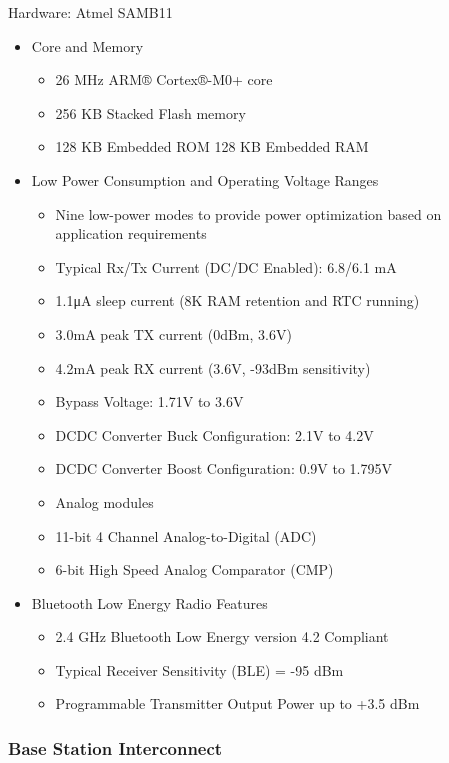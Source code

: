 \documentclass[journal]{IEEEtran}
\begin{document}
Hardware: Atmel SAMB11

\begin{itemize}
  \item Core and Memory
    \begin{itemize}
      \item 26 MHz ARM® Cortex®-M0+ core
      \item 256 KB Stacked Flash memory
      \item 128 KB Embedded ROM
        128 KB Embedded RAM
    \end{itemize}
  \item Low Power Consumption and Operating Voltage Ranges
    \begin{itemize}
      \item Nine low-power modes to provide power optimization based on application requirements
      \item Typical Rx/Tx Current (DC/DC Enabled): 6.8/6.1 mA
      \item 1.1μA sleep current (8K RAM retention and RTC running)
      \item 3.0mA peak TX current (0dBm, 3.6V)
      \item 4.2mA peak RX current (3.6V, -93dBm sensitivity)
      \item Bypass Voltage: 1.71V to 3.6V
      \item DCDC Converter Buck Configuration: 2.1V to 4.2V
      \item DCDC Converter Boost Configuration: 0.9V to 1.795V
      \item Analog modules
      \item 11-bit 4 Channel Analog-to-Digital (ADC)
      \item 6-bit High Speed Analog Comparator (CMP)
    \end{itemize}
  \item Bluetooth Low Energy Radio Features
    \begin{itemize}
      \item 2.4 GHz Bluetooth Low Energy version 4.2 Compliant
      \item Typical Receiver Sensitivity (BLE) = -95 dBm
      \item Programmable Transmitter Output Power up to +3.5 dBm
    \end{itemize}
\end{itemize}

\subsubsection{Base Station Interconnect}
\end{document}
